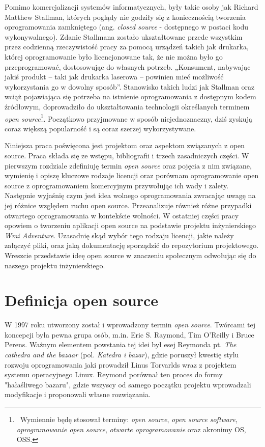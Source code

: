 \documentclass{article}
\begin{document}
Pomimo komercjalizacji systemów informatycznych, były takie osoby jak Richard Matthew Stallman, których poglądy nie godziły się z koniecznością tworzenia oprogramowania zamkniętego (ang. \emph{closed source} - dostępnego w postaci kodu wykonywalnego). Zdanie Stallmana zostało ukształtowane przede wszystkim przez codzienną rzeczywistość pracy za pomocą urządzeń takich jak drukarka, której oprogramowanie było licencjonowane tak, że nie można było go przeprogramować, dostosowując do własnych potrzeb. „Konsument, nabywając jakiś produkt – taki jak drukarka laserowa – powinien mieć możliwość wykorzystania go w dowolny sposób”\cite{Kotula}. Stanowisko takich ludzi jak Stallman oraz wciąż pojawiająca się potrzeba na istnienie oprogramowania z dostępnym kodem źródłowym, doprowadziło do ukształtowania technologii określanych terminem \emph{open source}\footnote{\, Wymiennie będę stosował terminy: \emph{open source}, \emph{open source software}, \emph{oprogramowanie open source}, \emph{otwarte oprogramowanie} oraz akronimy OS, OSS.}. Początkowo przyjmowane w sposób niejednoznaczny, dziś zyskują coraz większą popularność i są coraz szerzej wykorzystywane\cite{Kotula}. 

Niniejsza praca poświęcona jest projektom oraz aspektom związanych z open source. Praca składa się ze wstępu, bibliografii i trzech zasadniczych części. W pierwszym rozdziale zdefiniuję termin \emph{open source} oraz pojęcia z nim związane, wymienię i opiszę kluczowe rodzaje licencji oraz porównam oprogramowanie open source z oprogramowaniem komercyjnym przywołując ich wady i zalety. Następnie wyjaśnię czym jest idea wolnego oprogramowania zwracając uwagę na jej różnice względem ruchu open source. Przeanalizuje również różne przypadki otwartego oprogramowania w kontekście wolności. W ostatniej części pracy opowiem o tworzeniu aplikacji open source na podstawie projektu inżynierskiego \emph{Wmi Adventure}. Uzasadnię skąd wybór tego rodzaju licencji, jakie należy załączyć pliki, oraz jaką dokumentację sporządzić do repozytorium projektowego. Wreszcie przedstawie ideę open source w znaczeniu społecznym odwołując się do naszego projektu inżynierskiego.

\newpage
\section{Definicja open source}

\hspace{4mm} W 1997 roku utworzony został i wprowadzony termin \emph{open source}. Twórcami tej koncepcji była pewna grupa osób, m.in. Eric S. Raymond, Tim O'Reilly i Bruce Perens. Ważnym elementem powstania tej idei był esej Reymonda pt. \emph{The cathedra and the bazaar} (pol. \emph{Katedra i bazar}), gdzie poruszył kwestię stylu rozwoju oprogramowania jaki prowadził Linus Torvarlds wraz z projektem systemu operacyjnego Linux. Reymond porównał ten proces do formy "hałaśliwego bazaru", gdzie wszyscy od samego początku projektu wprowadzali modyfikacje i proponowali własne rozwiązania\cite{Kotula}.  
\end{document}
